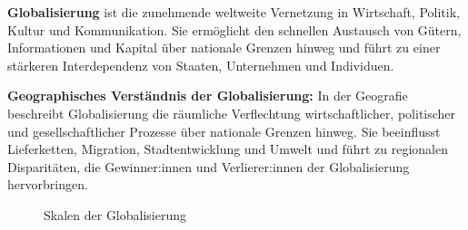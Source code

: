 \begin{mydefinition}[Globalisierung]
\textbf{Globalisierung} ist die zunehmende weltweite Vernetzung in Wirtschaft, Politik, Kultur und Kommunikation. Sie ermöglicht den schnellen Austausch von Gütern, Informationen und Kapital über nationale Grenzen hinweg und führt zu einer stärkeren Interdependenz von Staaten, Unternehmen und Individuen.

\textbf{Geographisches Verständnis der Globalisierung:} In der Geografie beschreibt Globalisierung die räumliche Verflechtung wirtschaftlicher, politischer und gesellschaftlicher Prozesse über nationale Grenzen hinweg. Sie beeinflusst Lieferketten, Migration, Stadtentwicklung und Umwelt und führt zu regionalen Disparitäten, die Gewinner:innen und Verlierer:innen der Globalisierung hervorbringen.

\begin{figure}[H]
\centering
{}
\caption{Skalen der Globalisierung}
\label{fig:scales}
\end{figure}
\end{mydefinition}
\clearpage

